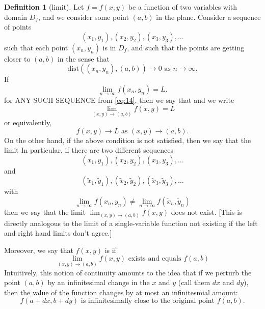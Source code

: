 \documentclass[10pt]{article}
\theoremstyle{definition}
\newtheorem{definition}[theorem]{Definition}
\newcommand{\1}[1]{\textbf{1}_{\left[#1\right]}} %
\newcommand{\dempfcolor}[1]{{\color{RoyalBlue}#1}}
\newcommand{\demph}[1]{\dempfcolor{{\sl #1}}}
\begin{document}
\newpage
\begin{definition}[limit]
  Let $f=f(x,y)$ be a function of two variables with domain $D_{f}$, and we
  consider some point $(a,b)$ in the plane. Consider a sequence of points
  \begin{equation}\label{eq:14}
    (x_{1},y_{1}), (x_{2},y_{2}), (x_{3},y_{3}),\ldots
  \end{equation}
  such that each point $(x_{n},y_{n})$ is in $D_{f}$, and such that the points
  are getting closer to $(a,b)$ in the sense that
  \begin{equation*}
    \text{dist}((x_{n},y_{n}),(a,b)) \to 0 \text{ as } n \to \infty.
  \end{equation*}
  If
  \begin{equation*}
    \lim_{n\to\infty} f(x_{n},y_{n}) = L.
  \end{equation*}
  for ANY SUCH SEQUENCE from \cref{eq:14}, then we say that \demph{$L$ is the
    limit of $f(x,y)$ as $(x,y) \to (a,b)$,} and we write
  \begin{equation*}
    \lim_{(x,y)\to (a,b)} f(x,y) = L
  \end{equation*}
  or equivalently,
  \begin{equation*}
    f(x,y) \to L \text{ as } (x,y) \to (a,b).
  \end{equation*}
  On the other hand, if the above condition is not satisfied, then we say that
  the limit \demph{does not exist (DNE).} In particular, if there are two
  different sequences
  \begin{equation*}
    (x_{1},y_{1}),(x_{2},y_{2}),(x_{3},y_{3}),\ldots
  \end{equation*}
  and
  \begin{equation*}
    (\tilde{x}_{1},\tilde{y}_{1}),(\tilde{x}_{2},\tilde{y}_{2}),(\tilde{x}_{3},\tilde{y}_{3}),\ldots
  \end{equation*}
  with
  \begin{equation*}
    \lim_{n\to\infty} f(x_{n},y_{n})\neq \lim_{n\to\infty} f(\tilde{x}_{n},\tilde{y}_{n})
  \end{equation*}
  then we say that the limit $\lim_{(x,y)\to (a,b)}f(x,y)$ does not exist.
  [This is directly analogous to the limit of a single-variable function not
  existing if the left and right hand limits don't agree.]
\end{definition}


Moreover, we say that $f(x,y)$ is \demph{continuous at $(a,b)$} if
\begin{equation*}
  \lim_{(x,y) \to (a,b)}f(x,y)\text{ exists and equals }f(a,b)
\end{equation*}
Intuitively, this notion of continuity amounts to the idea that if we perturb
the point $(a,b)$ by an infinitesimal change in the $x$ and $y$ (call them
$dx$ and $dy$), then the value of the function changes by at most an
infinitesmial amount:
\begin{equation*}
  f(a+dx, b+dy) \text{ is infinitesimally close to the original point } f(a,b).
\end{equation*}
\end{document}
